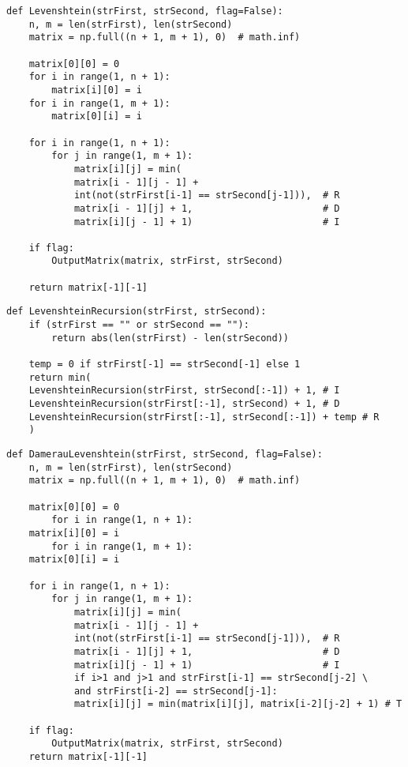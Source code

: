 \begin{lstlisting}[label=some-code,caption=Функция нахождения расстояния Левенштейна матрично]
def Levenshtein(strFirst, strSecond, flag=False):
	n, m = len(strFirst), len(strSecond)
	matrix = np.full((n + 1, m + 1), 0)  # math.inf)
	
	matrix[0][0] = 0
	for i in range(1, n + 1):
		matrix[i][0] = i
	for i in range(1, m + 1):
		matrix[0][i] = i
	
	for i in range(1, n + 1):
		for j in range(1, m + 1):
			matrix[i][j] = min(
			matrix[i - 1][j - 1] +
			int(not(strFirst[i-1] == strSecond[j-1])),  # R
			matrix[i - 1][j] + 1,                       # D
			matrix[i][j - 1] + 1)                       # I
		
	if flag:
		OutputMatrix(matrix, strFirst, strSecond)
	
	return matrix[-1][-1]
\end{lstlisting}


\begin{lstlisting}[label=some-code,caption=Рекурсивная функция нахождения расстояния Левенштейна ]
def LevenshteinRecursion(strFirst, strSecond):
	if (strFirst == "" or strSecond == ""):
		return abs(len(strFirst) - len(strSecond))
	
	temp = 0 if strFirst[-1] == strSecond[-1] else 1
	return min(
	LevenshteinRecursion(strFirst, strSecond[:-1]) + 1, # I
	LevenshteinRecursion(strFirst[:-1], strSecond) + 1, # D
	LevenshteinRecursion(strFirst[:-1], strSecond[:-1]) + temp # R
	)
\end{lstlisting}


\begin{lstlisting}[label=some-code,caption=Функция нахождения расстояния Дамерау-Левенштейна матрично]
def DamerauLevenshtein(strFirst, strSecond, flag=False):
	n, m = len(strFirst), len(strSecond)
	matrix = np.full((n + 1, m + 1), 0)  # math.inf)
	
	matrix[0][0] = 0
		for i in range(1, n + 1):
	matrix[i][0] = i
		for i in range(1, m + 1):
	matrix[0][i] = i
	
	for i in range(1, n + 1):
		for j in range(1, m + 1):
			matrix[i][j] = min(
			matrix[i - 1][j - 1] +
			int(not(strFirst[i-1] == strSecond[j-1])),  # R
			matrix[i - 1][j] + 1,                       # D
			matrix[i][j - 1] + 1)                       # I
			if i>1 and j>1 and strFirst[i-1] == strSecond[j-2] \
			and strFirst[i-2] == strSecond[j-1]:
			matrix[i][j] = min(matrix[i][j], matrix[i-2][j-2] + 1) # T
	
	if flag:
		OutputMatrix(matrix, strFirst, strSecond)
	return matrix[-1][-1]
\end{lstlisting}


